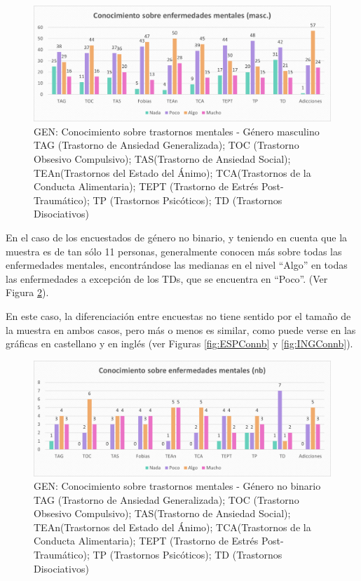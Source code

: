 \documentclass[12pt, a4paper,twoside,titlepage]{book}
\begin{document}
\begin{figure}
\centering
 \includegraphics[width=1\linewidth]{ANEXO Gen/12AnexGENCongmasc}
 \caption{GEN: Conocimiento sobre trastornos mentales - Género masculino\\
 TAG (Trastorno de Ansiedad Generalizada); TOC (Trastorno Obsesivo Compulsivo); TAS(Trastorno de Ansiedad Social); TEAn(Trastornos del Estado del Ánimo); TCA(Trastornos de la Conducta Alimentaria); TEPT (Trastorno de Estrés Post-Traumático); TP (Trastornos Psicóticos); TD (Trastornos Disociativos) }
 \label{fig:Conmasc}
 \end{figure}

En el caso de los encuestados de género no binario, y teniendo en cuenta que la muestra es de tan sólo 11 personas, generalmente conocen más sobre todas las enfermedades mentales, encontrándose las medianas en el nivel “Algo” en todas las enfermedades a excepción de los TDs, que se encuentra en “Poco”. (Ver Figura \ref{fig:Conbn}). 

En este caso, la diferenciación entre encuestas no tiene sentido por el tamaño de la muestra en ambos casos, pero más o menos es similar, como puede verse en las gráficas en castellano y en inglés (ver Figuras \ref{fig:ESPConnb} y \ref{fig:INGConnb}). 


\begin{figure}
\centering
 \includegraphics[width=1\linewidth]{ANEXO Gen/13AnexGENConnb}
 \caption{GEN: Conocimiento sobre trastornos mentales - Género no binario\\
 TAG (Trastorno de Ansiedad Generalizada); TOC (Trastorno Obsesivo Compulsivo); TAS(Trastorno de Ansiedad Social); TEAn(Trastornos del Estado del Ánimo); TCA(Trastornos de la Conducta Alimentaria); TEPT (Trastorno de Estrés Post-Traumático); TP (Trastornos Psicóticos); TD (Trastornos Disociativos) }
 \label{fig:Conbn}
 \end{figure}
\end{document}
